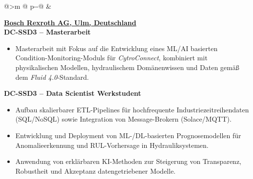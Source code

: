 \begin{tabular}{@{}>{\raggedleft\arraybackslash}m{\datecol} @{\hspace{\colgap}} p{\dimexpr\textwidth-\datecol-\colgap\relax}@{}}
 &
\begin{minipage}[t]{\linewidth}\vspace{0pt}
\begin{expblock}
  \footnotesize
  \setlength{\parindent}{0pt}\setlength{\parskip}{0pt}
  \textbf{\href{https://www.boschrexroth.com/en/dc/}{Bosch Rexroth AG, Ulm, Deutschland}}\\[-0.1em]
  \textbf{DC-SSD3 – Masterarbeit}\\[-1em]
    \begin{itemize}[nosep,leftmargin=1em]
    \item Masterarbeit mit Fokus auf die Entwicklung eines ML/AI basierten Condition-Monitoring-Moduls für \emph{CytroConnect}, kombiniert mit physikalischen Modellen, hydraulischem Domänenwissen und Daten gemäß dem \emph{Fluid 4.0}-Standard.
    \end{itemize}
  \textbf{DC-SSD3 – Data Scientist Werkstudent}\\[-1em]
  \begin{itemize}[nosep,leftmargin=1em]
\item Aufbau skalierbarer ETL-Pipelines für hochfrequente Industrie­zeitreihendaten (SQL/NoSQL) sowie Integration von Message-Brokern (Solace/MQTT).
\item Entwicklung und Deployment von ML-/DL-basierten Prognosemodellen für Anomalieerkennung und RUL-Vorhersage in Hydrauliksystemen.
\item Anwendung von erklärbaren KI-Methoden zur Steigerung von Transparenz, Robustheit und Akzeptanz datengetriebener Modelle.

  \end{itemize}
\end{expblock}
\end{minipage}
\\[-0.2em]



\end{tabular}
